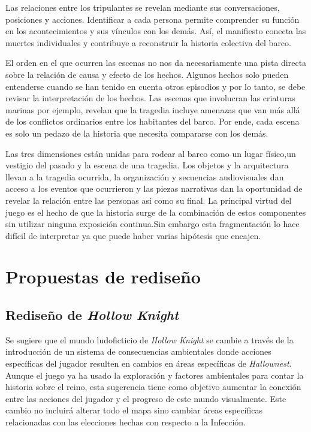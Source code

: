 \documentclass[12pt,a4paper]{article}
\begin{document}
Las relaciones entre los tripulantes se revelan mediante sus conversaciones, posiciones y acciones. Identificar a cada persona permite comprender su función en los acontecimientos y sus vínculos con los demás. Así, el manifiesto conecta las muertes individuales y contribuye a reconstruir la historia colectiva del barco.

El orden en el que ocurren las escenas no nos da necesariamente una pista directa sobre la relación de causa y efecto de los hechos. Algunos hechos solo pueden entenderse cuando se han tenido en cuenta otros episodios y por lo tanto, se debe revisar la interpretación de los hechos. Las escenas que involucran las criaturas marinas por ejemplo, revelan que la tragedia incluye amenazas que van más allá de los conflictos ordinarios entre los habitantes del barco. Por ende, cada escena es solo un pedazo de la historia que necesita compararse con los demás.

Las tres dimensiones están unidas para rodear al barco como un lugar físico,un vestigio del pasado y la escena de una tragedia. Los objetos y la arquitectura llevan a la tragedia ocurrida, la organización y secuencias audiovisuales dan acceso a los eventos que ocurrieron y las piezas narrativas dan la oportunidad de revelar la relación entre las personas así como su final. La principal virtud del juego es el hecho de que la historia surge de la combinación de estos componentes sin utilizar ninguna exposición continua.Sin embargo esta fragmentación lo hace difícil de interpretar ya que puede haber varias hipótesis que encajen.

\section{Propuestas de rediseño}

\subsection{Rediseño de \textit{Hollow Knight}}
Se sugiere que el mundo ludoficticio de \textit{Hollow Knight} se cambie a través de la introducción de un sistema de consecuencias ambientales donde acciones específicas del jugador resulten en cambios en áreas específicas de \textit{Hallownest}. Aunque el juego ya ha usado la exploración y factores ambientales para contar la historia sobre el reino, esta sugerencia tiene como objetivo aumentar la conexión entre las acciones del jugador y el progreso de este mundo visualmente. Este cambio no incluirá alterar todo el mapa sino cambiar áreas específicas relacionadas con las elecciones hechas con respecto a la Infección.
\end{document}
